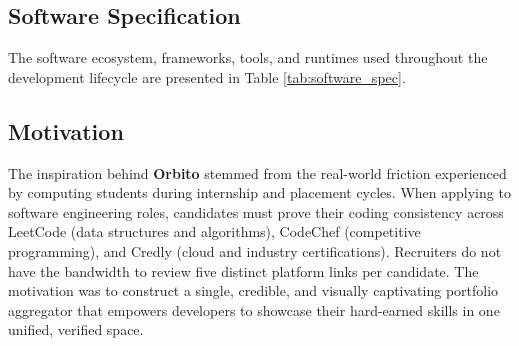 \documentclass[12pt,a4paper]{article}
\begin{document}
\subsection{Software Specification}
The software ecosystem, frameworks, tools, and runtimes used throughout the development lifecycle are presented in Table \ref{tab:software_spec}.

\begin{table}[H]
\centering
\caption{Software Specifications and Tool Versions}
\label{tab:software_spec}
\end{table}

\subsection{Motivation}
The inspiration behind \textbf{Orbito} stemmed from the real-world friction experienced by computing students during internship and placement cycles. When applying to software engineering roles, candidates must prove their coding consistency across LeetCode (data structures and algorithms), CodeChef (competitive programming), and Credly (cloud and industry certifications). Recruiters do not have the bandwidth to review five distinct platform links per candidate. The motivation was to construct a single, credible, and visually captivating portfolio aggregator that empowers developers to showcase their hard-earned skills in one unified, verified space.
\end{document}
